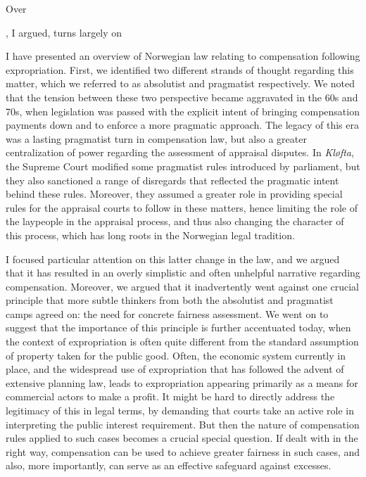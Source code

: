 Over 




, I argued, turns largely on 


I have presented an overview of Norwegian law relating to compensation following expropriation. First, we identified two different strands of thought regarding this matter, which we referred to as absolutist and pragmatist respectively. We noted that the tension between these two perspective became aggravated in the 60s and 70s, when legislation was passed with the explicit intent of bringing compensation payments down and to enforce a more pragmatic approach. The legacy of this era was a lasting pragmatist turn in compensation law, but also a greater centralization of power regarding the assessment of appraisal disputes. In \emph{Kløfta}, the Supreme Court modified some pragmatist rules introduced by parliament, but they also sanctioned a range of disregards that reflected the pragmatic intent behind these rules. Moreover, they assumed a greater role in providing special rules for the appraisal courts to follow in these matters, hence limiting the role of the laypeople in the appraisal process, and thus also changing the character of this process, which has long roots in the Norwegian legal tradition.

I focused particular attention on this latter change in the law, and we argued that it has resulted in an overly simplistic and often unhelpful narrative regarding compensation. Moreover, we argued that it inadvertently went against one crucial principle that more subtle thinkers from both the absolutist and pragmatist camps agreed on: the need for concrete fairness assessment. We went on to suggest that the importance of this principle is further accentuated today, when the context of expropriation is often quite different from the standard assumption of property taken for the public good. Often, the economic system currently in place, and the widespread use of expropriation that has followed the advent of extensive planning law, leads to expropriation appearing primarily as a means for commercial actors to make a profit. It might be hard to directly address the legitimacy of this in legal terms, by demanding that courts take an active role in interpreting the public interest requirement. But then the nature of compensation rules applied to such cases becomes a crucial special question. If dealt with in the right way, compensation can be used to achieve greater fairness in such cases, and also, more importantly, can serve as an effective safeguard against excesses. 

